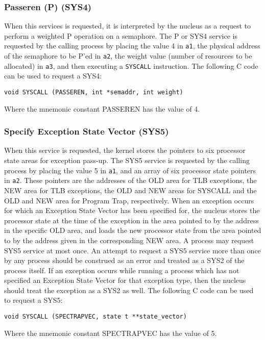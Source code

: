 \subsubsection{Passeren (P) (SYS4)}
When this services is requested, it is interpreted by the nucleus as a request to
perform a weighted P operation on a semaphore.
The P or SYS4 service is requested by the calling process by placing the value
4 in \verb+a1+, the physical address of the semaphore to be P'ed in \verb+a2+, 
the weight value (number of resources to be allocated) in \verb+a3+,
and then executing a \verb+SYSCALL+ instruction.
The following C code can be used to request a SYS4:
\begin{verbatim}
void SYSCALL (PASSEREN, int *semaddr, int weight)
\end{verbatim}
	Where the mnemonic constant PASSEREN has the value of 4.
\subsubsection{Specify Exception State Vector (SYS5)}
When this service is requested, the kernel stores the pointers to
six processor state areas for exception pass-up.
The SYS5 service is requested by the calling process by placing the value 5
in \verb+a1+, and an array of six processor state pointers in \verb+a2+.
These pointers are the addresses of the OLD area for TLB exceptions,
the NEW area for TLB exceptions, the OLD and NEW areas for SYSCALL and
the OLD and NEW area for Program Trap, respectively.
When an exception occurs for which an Exception State Vector has been specified
for, the nucleus stores the processor state at the time of the exception in the area
pointed to by the address in the specific OLD area, and loads the new processor state from the area
pointed to by the address given in the corresponding NEW area.
A process may request SYS5 service at most once.
An attempt to request a SYS5 service more than once by any process should be construed as an error and treated as a SYS2
of the process itself.
If an exception occurs while running a process which has not specified an
Exception State Vector for that exception type, then the nucleus should treat the
exception as a SYS2 as well.
The following C code can be used to request a SYS5:
\begin{verbatim}
void SYSCALL (SPECTRAPVEC, state t **state_vector)
\end{verbatim}
Where the mnemonic constant SPECTRAPVEC has the value of 5.
